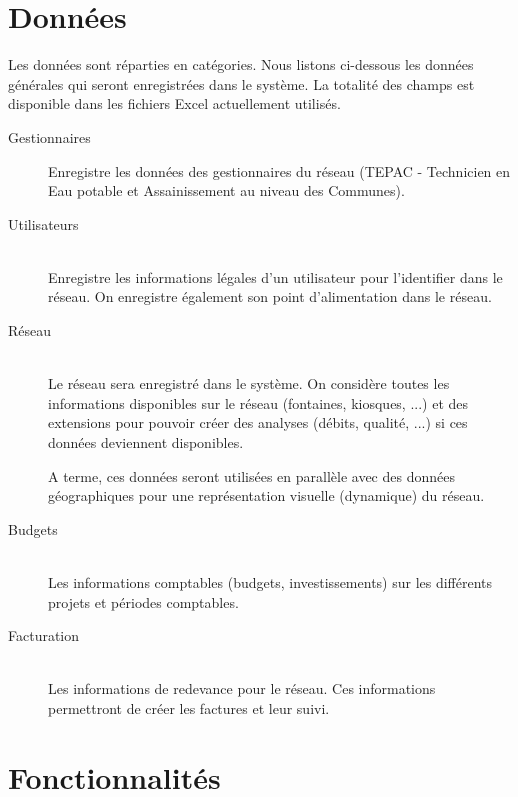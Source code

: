 \documentclass[a4paper, 11pt]{article}
\begin{document}
\section{Données}
Les données sont réparties en catégories. Nous listons ci-dessous les données générales qui seront enregistrées dans le système. La totalité des champs est disponible dans les fichiers Excel actuellement utilisés.
\begin{description}
  \item[Gestionnaires]
    Enregistre les données des gestionnaires du réseau (TEPAC - Technicien en Eau potable et Assainissement au niveau des Communes).

  \item[Utilisateurs] ~ \\
    Enregistre les informations légales d'un utilisateur pour l'identifier dans le réseau. On enregistre également son point d'alimentation dans le réseau.

  \item[Réseau] ~ \\
    Le réseau sera enregistré dans le système. On considère toutes les informations disponibles sur le réseau (fontaines, kiosques, ...) et des extensions pour pouvoir créer des analyses (débits, qualité, ...) si ces données deviennent disponibles.

    A terme, ces données seront utilisées en parallèle avec des données géographiques pour une représentation visuelle (dynamique) du réseau.

  \item[Budgets] ~ \\
    Les informations comptables (budgets, investissements) sur les différents projets et périodes comptables.

  \item[Facturation] ~ \\
    Les informations de redevance pour le réseau. Ces informations permettront de créer les factures et leur suivi.


\end{description}

\section{Fonctionnalités}
\end{document}
